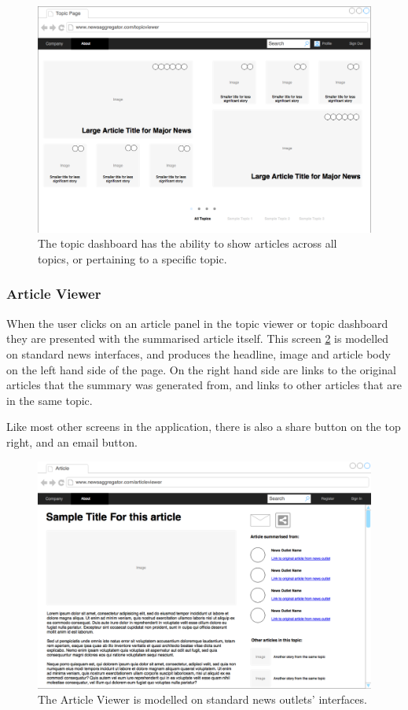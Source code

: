 \documentclass[12pt]{article}
\begin{document}
\begin{figure}[ht!]
  \centering
    \includegraphics[scale=0.3]{TopicDashboard.png}
   \caption[A wireframe of the Topic Dashboard]{The topic dashboard has the ability to show articles across all topics, or pertaining to a specific topic.}
   \label{topicDashboard}
\end{figure}

\subsubsection{Article Viewer}

When the user clicks on an article panel in the topic viewer or topic dashboard they are presented with the summarised article itself. This screen \ref{articleViewer} is modelled on standard news interfaces, and produces the headline, image and article body on the left hand side of the page. On the right hand side are links to the original articles that the summary was generated from, and links to other articles that are in the same topic. 

Like most other screens in the application, there is also a share button on the top right, and an email button.

\label{articleviewer}

\begin{figure}[ht!]
  \centering
    \includegraphics[scale=0.3]{ArticleViewer.png}
   \caption[A wireframe of the Article Viewer]{The Article Viewer is modelled on standard news outlets' interfaces.}
   \label{articleViewer}
\end{figure}
\end{document}
